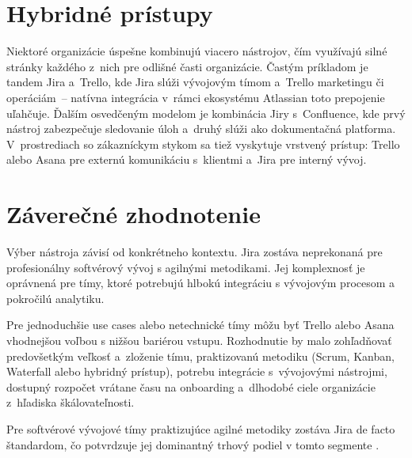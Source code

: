 \section{Hybridné prístupy}

Niektoré organizácie úspešne kombinujú viacero nástrojov, čím využívajú silné stránky každého z~nich pre odlišné časti organizácie. Častým príkladom je tandem Jira a~Trello, kde Jira slúži vývojovým tímom a~Trello marketingu či operáciám~-- natívna integrácia v~rámci ekosystému Atlassian toto prepojenie uľahčuje. Ďalším osvedčeným modelom je kombinácia Jiry s~Confluence, kde prvý nástroj zabezpečuje sledovanie úloh a~druhý slúži ako dokumentačná platforma. V~prostrediach so zákazníckym stykom sa tiež vyskytuje vrstvený prístup: Trello alebo Asana pre externú komunikáciu s~klientmi a~Jira pre interný vývoj.

\section{Záverečné zhodnotenie}

Výber nástroja závisí od konkrétneho kontextu. Jira zostáva neprekonaná pre profesionálny softvérový vývoj s agilnými metodikami. Jej komplexnosť je oprávnená pre tímy, ktoré potrebujú hlbokú integráciu s vývojovým procesom a pokročilú analytiku.

Pre jednoduchšie use cases alebo netechnické tímy môžu byť Trello alebo Asana vhodnejšou voľbou s nižšou bariérou vstupu. Rozhodnutie by malo zohľadňovať predovšetkým veľkosť a~zloženie tímu, praktizovanú metodiku (Scrum, Kanban, Waterfall alebo hybridný prístup), potrebu integrácie s~vývojovými nástrojmi, dostupný rozpočet vrátane času na onboarding a~dlhodobé ciele organizácie z~hľadiska škálovateľnosti.

Pre softvérové vývojové tímy praktizujúce agilné metodiky zostáva Jira de facto štandardom, čo potvrdzuje jej dominantný trhový podiel v tomto segmente \cite{stateofagile2023}.

